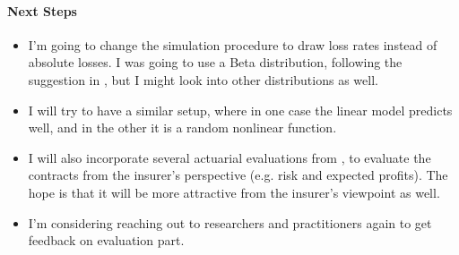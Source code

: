 \documentclass[11pt]{article}
\begin{document}
\paragraph*{Next Steps}
\begin{itemize}
    \item I'm going to change the simulation procedure to draw loss rates instead of absolute losses. I was going to use a Beta distribution, following the suggestion in \cite{mapfumo2017risk}, but I might look into other distributions as well. 
    \item I will try to have a similar setup, where in one case the linear model predicts well, and in the other it is a random nonlinear function. 
    \item I will also incorporate several actuarial evaluations from \cite{mapfumo2017risk}, to evaluate the contracts from the insurer's perspective (e.g. risk and expected profits). The hope is that it will be more attractive from the insurer's viewpoint as well. 
    \item I'm considering reaching out to researchers and practitioners again to get feedback on evaluation part. 
\end{itemize}
\end{document}

